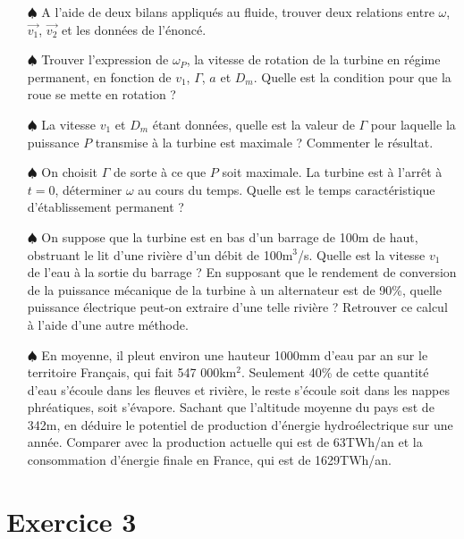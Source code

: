 \documentclass{report}
\begin{document}
\begin{itemize}

	\item[$\spadesuit$] A l'aide de deux bilans appliqués au fluide, trouver deux relations entre $\omega$,  $\vec{v_1}$,  $\vec{v_2}$ et les données de l'énoncé.
	
	\item[$\spadesuit$] Trouver l'expression de $\omega_P$, la vitesse de rotation de la turbine en régime permanent, en fonction de $v_1$, $\Gamma$, $a$ et $D_m$. Quelle est la condition pour que la roue se mette en rotation ?
	
	\item[$\spadesuit$] La vitesse $v_1$ et $D_m$ étant données, quelle est la valeur de $\Gamma$ pour laquelle la puissance $P$ transmise à la turbine est maximale ? Commenter le résultat.
	
	\item[$\spadesuit$] On choisit $\Gamma$ de sorte à ce que $P$ soit maximale. La turbine est à l'arrêt à $t=0$, déterminer $\omega$ au cours du temps. Quelle est le temps caractéristique d'établissement permanent ?
	
	\item[$\spadesuit$] On suppose que la turbine est en bas d'un barrage de 100m de haut, obstruant le lit d'une rivière d'un débit de 100m$^3$/s. Quelle est la vitesse $v_1$ de l'eau à la sortie du barrage ? En supposant que le rendement de conversion de la puissance mécanique de la turbine à un alternateur est de 90\%, quelle puissance électrique peut-on extraire d'une telle rivière ? Retrouver ce calcul à l'aide d'une autre méthode.
	
	\item[$\spadesuit$] En moyenne, il pleut environ une hauteur 1000mm d'eau par an sur le territoire Français, qui fait 547 000km$^2$. Seulement 40\% de cette quantité d'eau s'écoule dans les fleuves et rivière, le reste s'écoule soit dans les nappes phréatiques, soit s'évapore. Sachant que l'altitude moyenne du pays est de 342m, en déduire le potentiel de production d'énergie hydroélectrique sur une année. Comparer avec la production actuelle qui est de 63TWh/an et la consommation d'énergie finale en France, qui est de 1629TWh/an.

\end{itemize}

\newpage

\section*{Exercice 3}
\end{document}
